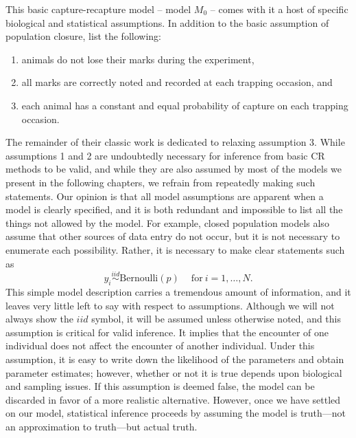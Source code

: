 This  basic capture-recapture model -- model $M_{0}$ -- comes with it
a host of specific biological and statistical assumptions.
In addition to the basic assumption of population closure,
\citet{otis_etal:1978} list the following:
\begin{enumerate}
  \item animals do not lose their marks during the experiment,
  \item all marks are correctly noted and recorded at each trapping
    occasion, and
  \item each animal has a constant and equal probability of capture on
    each trapping occasion.
\end{enumerate}
The remainder of their classic work is dedicated to relaxing
assumption 3. While assumptions 1 and 2 are undoubtedly necessary for
inference from basic CR methods to be valid, and while they are
also assumed by most of the models we present in the following
chapters, we refrain from repeatedly making such statements. Our
opinion is that all model assumptions are apparent when a model is
clearly specified, and it is both redundant and impossible to list all
the things not allowed by the model. For example, closed population
models also assume that other sources of data entry do not occur, but
it is not necessary to enumerate each possibility. Rather, it is
necessary to make clear statements such as
\[
y_i \stackrel{iid}{\sim} \text{Bernoulli}(p) \quad \: \text{for}\: i=1,\ldots,N.
\]
This simple model description carries a tremendous amount of
information, and it leaves very little left to say with respect to
assumptions. Although we will not always show the $iid$ symbol, it
will be assumed unless otherwise noted, and this assumption is
critical for valid inference. It implies that the encounter of one
individual does not affect the encounter of another
individual. Under this assumption, it is  easy to write down the
likelihood of the parameters and obtain parameter estimates; however,
whether or not it is true depends upon biological and sampling
issues. If this assumption is deemed false, the model can be discarded
in favor of a more realistic alternative. However, once we have
settled on our model, statistical inference proceeds by assuming the
model is truth---not an approximation to truth---but actual
truth.

